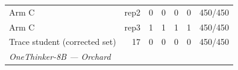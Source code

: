 \begin{table}[t]
{\begin{tabular}{lrrrrrr}
Arm C & rep2 & 0 & 0 & 0 & 0 & 450/450 \\
Arm C & rep3 & 1 & 1 & 1 & 1 & 450/450 \\
Trace student (corrected set) & 17 & 0 & 0 & 0 & 0 & 450/450 \\
\midrule
\multicolumn{7}{l}{\textit{OneThinker-8B --- Orchard}} \\

\end{tabular}}
\end{table}

